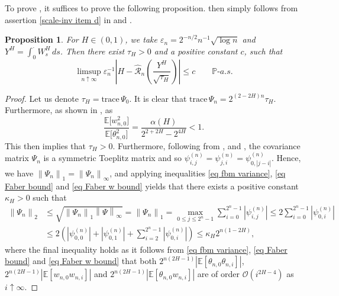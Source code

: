 \documentclass[12pt,reqno]{article}
\def\trace#1{\text{trace}\, #1}
\newcommand{\norm}[1]{\left\lVert {#1}\right\rVert}
\def\ua{\uparrow}
\def\wh{\widehat}
\numberwithin{equation}{section}
\def\cR{{\mathscr R}}
\newtheorem{proposition}[theorem]{Proposition}
\theoremstyle{definition}
\def\ua{\uparrow}
\def\wh{\widehat}
\newcommand{\bE}{\mathbb{E}}
\newcommand{\bP}{\mathbb{P}}
\begin{document}
To prove , it suffices to prove the following proposition.  then simply follows from assertion \ref{scale-inv item d} in  and \cite[Theorem 1.4]{HanSchiedGirsanov}.

\begin{proposition}\label{previous prop 4.9}
	For $H \in (0,1)$, we take $\varepsilon_n = 2^{-n/2}n^{-1}\sqrt{\log n}$ and $Y^H = \int_{0}^{\cdot}W^H_s\,ds$. Then there exist $\tau_H > 0$ and a positive constant $c$, such that 
	\begin{equation*}
		\limsup_{n \ua \infty}\varepsilon_n^{-1}\left|H - \wh \cR_n\left(\frac{Y^H}{\sqrt{\tau_H}}\right)\right| \le c \qquad \bP\text{-}a.s.
	\end{equation*}
\end{proposition}
\begin{proof}
	Let us denote $\tau_H = \trace\Psi_0$. It is clear that $\trace\Psi_n = 2^{(2-2H)n}\tau_H$. Furthermore, as shown in , as 
	\begin{equation*}
		\frac{\bE\big[w^2_{n,0}\big]}{\bE\big[\theta^2_{n,0}\big]} = \frac{\alpha(H)}{2^{2+2H}-2^{4H}} < 1. 
	\end{equation*}
	This then implies that $\tau_H > 0$. Furthermore, following from ,  and , the covariance matrix $\Psi_n$ is a symmetric Toeplitz matrix and so $\psi^{(n)}_{i,j} = \psi^{(n)}_{j,i} = \psi^{(n)}_{0,|j-i|}$. Hence, we have $\norm{\Psi_n}_1 = \norm{\Psi_n}_\infty$, and applying inequalities \eqref{eq fbm variance}, \eqref{eq Faber bound} and \eqref{eq Faber w bound} yields that there exists a positive constant $\kappa_H > 0$ such that  
	\begin{equation*}
		\begin{split}
			\norm{\Psi_n}_2 &\le \sqrt{\norm{\Psi_n}_1\norm{\Psi}_\infty} = \norm{\Psi_n}_1 = \max_{0 \le j \le 2^n-1}\sum_{i = 0}^{2^n-1}|\psi^{(n)}_{i,j}| \le 2\sum_{i = 0}^{2^n-1}|\psi^{(n)}_{0,i}|\\& \le 2\left(|\psi^{(n)}_{0,0}|+ |\psi^{(n)}_{0,1}| + \sum_{i = 2}^{2^n-1}|\psi^{(n)}_{0,i}|\right) \le \kappa_H 2^{n(1-2H)},
		\end{split}
	\end{equation*}
	where the final inequality holds as it follows from \eqref{eq fbm variance}, \eqref{eq Faber bound} and \eqref{eq Faber w bound} that both $2^{n(2H-1)}|\bE[\theta_{n,0}\theta_{n,i}]|$, $2^{n(2H-1)}|\bE[w_{n,0}w_{n,i}]|$ and $2^{n(2H-1)}|\bE[\theta_{n,0}w_{n,i}]|$ are of order $\mathcal{O}(i^{2H-4})$ as $i \ua \infty$.
	

\end{proof}
\end{document}
